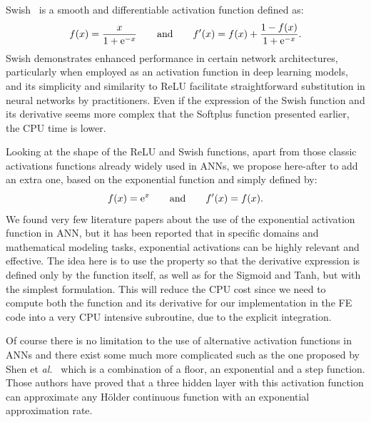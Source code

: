 \documentclass[algorithms,article,submit,pdftex,oneauthors]{Definitions/mdpi}
\makeatletter
\DeclareRobustCommand{\e}[1]{{\rm e}^{#1}}
\DeclareRobustCommand{\eal}{et \emph{al.}\@\xspace}
\makeatother
\begin{document}
Swish~\cite{Ramachandran-2018-SAF} is a smooth and differentiable activation function defined as:
\begin{equation}
f(x) = \frac{x}{1+\e{-x}}\qquad \text{and}\qquad f'(x) = f(x) + \frac{1 - f(x)}{1+\e{-x}}.\label{eq:act-swish}
\end{equation}
\textcolor{greencolor}{Swish demonstrates enhanced performance in certain network architectures, particularly when employed as an activation function in deep learning models, and its simplicity and similarity to ReLU facilitate straightforward substitution in neural networks by practitioners.}
Even if the expression of the Swish function and its derivative seems more complex that the Softplus function presented earlier, the CPU time is lower.

Looking at the shape of the ReLU and Swish functions, apart from those classic activations functions already widely used in ANNs, we propose here-after to add an extra one, based on the exponential function and simply defined by:
\begin{equation}
f(x) = \e{x}\qquad \text{and}\qquad f'(x) = f(x).\label{eq:act-exp}
\end{equation}
We found very few literature papers about the use of the exponential activation function in ANN, but it has been reported that in specific domains and mathematical modeling tasks, exponential activations can be highly relevant and effective.
\textcolor{greencolor}{The idea here is to use the property so that the derivative expression is defined only by the function itself, as well as for the Sigmoid and Tanh, but with the simplest formulation.}
\textcolor{greencolor}{This will reduce the CPU cost since we need to compute both the function and its derivative for our implementation in the FE code into a very CPU intensive subroutine, due to the explicit integration}.

Of course there is no limitation to the use of alternative activation functions in ANNs and there exist some much more complicated such as the one proposed by Shen \eal~\cite{Shen-2021-NNA} which is a combination of a floor, an exponential and a step function.
Those authors have proved that a three hidden layer with this activation function can approximate any Hölder continuous function with an exponential approximation rate.
\end{document}
